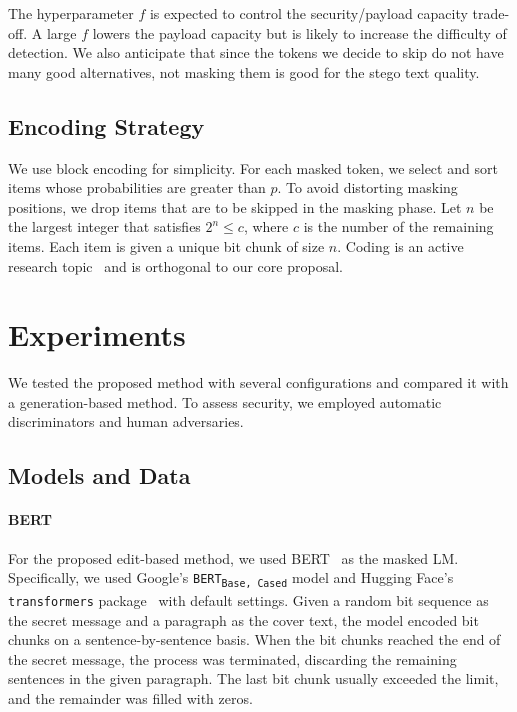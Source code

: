 \documentclass[11pt]{article}
\begin{document}
The hyperparameter $f$ is expected to control the security/payload capacity trade-off.
A large $f$ lowers the payload capacity but is likely to increase the difficulty of detection.
We also anticipate that since the tokens we decide to skip do not have many good alternatives, not masking them is good for the stego text quality.

\subsection{Encoding Strategy} \label{sec:proposed-encoding}
We use block encoding for simplicity.
For each masked token, we select and sort items whose probabilities are greater than $p$.
To avoid distorting masking positions, we drop items that are to be skipped in the masking phase.
Let $n$ be the largest integer that satisfies $2^n \leq c$, where $c$ is the number of the remaining items.
Each item is given a unique bit chunk of size $n$.
Coding is an active research topic~\citep{dai-cai-2019-towards,ziegler-etal-2019-neural,shen-etal-2020-near} and is orthogonal to our core proposal.


\section{Experiments} \label{sec:exp}
We tested the proposed method with several configurations and compared it with a generation-based method.
To assess security, we employed automatic discriminators and human adversaries.

\subsection{Models and Data} \label{sec:exp-model-data}
\paragraph{BERT}
For the proposed edit-based method, we used BERT~\citep{devlin-etal-2019-bert} as the masked LM.
Specifically, we used Google's \texttt{BERT\textsubscript{Base, Cased}} model and Hugging Face's \texttt{transformers} package~\citep{wolf-etal-2020-transformers} with default settings.
Given a random bit sequence as the secret message and a paragraph as the cover text, the model encoded bit chunks on a sentence-by-sentence basis.
When the bit chunks reached the end of the secret message, the process was terminated, discarding the remaining sentences in the given paragraph.
The last bit chunk usually exceeded the limit, and the remainder was filled with zeros.
\end{document}
